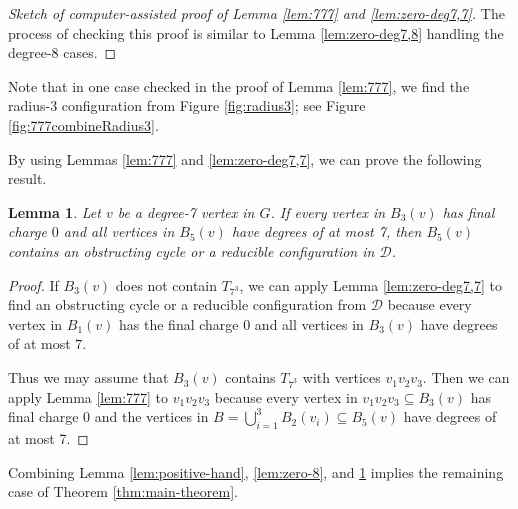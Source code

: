 \documentclass[10pt,a4paper]{article}
\newtheorem{lem}[thm]{Lemma}
\newcommand{\mikkel}[1]{\textbf{\textcolor{red}{{M: } #1}}}
\def\cD{{\mathcal D}}
\def\Tseven{{T_{7^3}}}
\newcommand{\yuta}[1]{\textbf{\textcolor{violet}{{Y: }#1}}}
\begin{document}
\begin{proof}[Sketch of computer-assisted proof of Lemma \ref{lem:777} and \ref{lem:zero-deg7,7}] 
The process of checking this proof is similar to Lemma \ref{lem:zero-deg7,8} handling the degree-$8$ cases.
\end{proof}

Note that in one case checked in the proof of Lemma \ref{lem:777}, we find the radius-3 configuration from Figure \ref{fig:radius3}; see Figure \ref{fig:777combineRadius3}.

By using Lemmas \ref{lem:777} and \ref{lem:zero-deg7,7}, we can prove the following result. 
\begin{lem}
    \label{lem:zero-7}
    Let $v$ be a degree-7 vertex in $G$.
    If every vertex in $B_3(v)$ has final charge $0$ and all vertices in $B_5(v)$ have degrees of at most 7, then $B_5(v)$ contains an obstructing cycle or a reducible configuration in $\cD$.
\end{lem}
\begin{proof}
    If $B_3(v)$ does not contain $\Tseven$, we can apply Lemma \ref{lem:zero-deg7,7} to find an obstructing cycle or a reducible configuration from $\mathcal{D}$ because every vertex in $B_1(v)$ has the final charge $0$ and all vertices in $B_3(v)$ have degrees of at most $7$.

    Thus we may assume that $B_3(v)$ contains $\Tseven$ with vertices $v_1v_2v_3$.
    Then we can apply Lemma \ref{lem:777} to $v_1v_2v_3$ because every vertex in $v_1v_2v_3 \subseteq B_3(v)$ has final charge $0$ and the vertices in $B = \bigcup_{i=1}^3 B_2(v_i) \subseteq B_5(v)$ have degrees of at most 7.
\end{proof}



Combining Lemma \ref{lem:positive-hand}, \ref{lem:zero-8}, and \ref{lem:zero-7} implies the remaining case of Theorem \ref{thm:main-theorem}.
\end{document}
